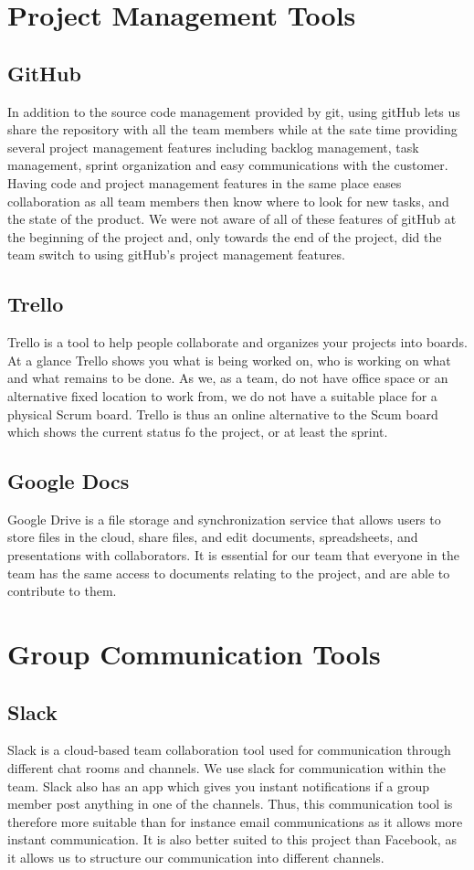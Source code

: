 \section{Project Management Tools}
\subsection{GitHub}
In addition to the source code management provided by git, using gitHub lets us share the repository with all the team members while at the sate time providing several project management features including backlog management, task management, sprint organization and easy communications with the customer. Having code and project management features in the same place eases collaboration as all team members then know where to look for new tasks, and the state of the product. We were not aware of all of these features of gitHub at the beginning of the project and, only towards the end of the project, did the team switch to using gitHub's project management features. 
\subsection{Trello}
Trello is a tool to help people collaborate and organizes your projects into boards. At a glance Trello shows you what is being worked on, who is working on what and what remains to be done. 
As we, as a team,  do not have office space or an alternative fixed location to work from, we do not have a suitable place for a physical Scrum board. Trello is  thus an online alternative to the Scum board which shows the current status fo the project, or at least the sprint.
\subsection{Google Docs}
Google Drive is a file storage and synchronization service that allows users to store files in the cloud, share files, and edit documents, spreadsheets, and presentations with collaborators. It is essential for our team that everyone in the team has the same access to documents relating to the project, and are able to contribute to them.
\section{Group Communication Tools}
\subsection{Slack}
Slack is a cloud-based team collaboration tool used for communication through different chat rooms and channels. We use slack for communication within the team. Slack also has an app which gives you  instant notifications if a group member post anything in one of the channels. Thus, this communication tool is therefore more suitable than for instance email communications as it allows more instant communication. It is also better suited to this project than Facebook, as it allows us to structure our communication into different channels. 


